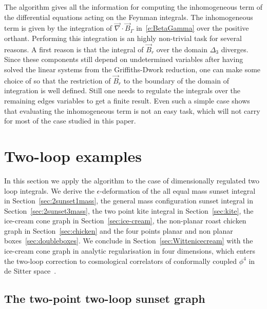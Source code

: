 \documentclass[a4paper,12pt]{article}
\numberwithin{equation}{section}
\numberwithin{figure}{section}
\begin{document}
The algorithm gives all the information for computing the
inhomogeneous term of the differential equations acting on the Feynman
integrals. The inhomogeneous term  is given by the  integration of
$\vec\nabla\cdot \vec B_\Gamma$ in~\eqref{e:BetaGamma}  over the
positive orthant. Performing this integration is an highly non-trivial
task for several reasons. A first reason is that the integral of $\vec B_r$
over the domain $\Delta_3$ diverges.
Since these components still
depend on undetermined variables  after having solved the linear systems from the
Griffiths-Dwork reduction, one can make some choice of so that the
restriction of $\vec B_r$ to the boundary of the domain of integration
is well defined. Still one needs to regulate the integrals over the
remaining edges variables  to get a finite
result.
Even such a simple case shows that evaluating the
inhomogeneous term is not an easy task, which will not carry for most
of the case studied in this paper. 


\section{Two-loop examples}\label{sec:twoloop}
%
In this section we apply the algorithm to  the case of dimensionally
 regulated two loop integrals. We derive the $\epsilon$-deformation of
the all equal mass sunset integral in Section~\ref{sec:2sunset1mass}, the general mass configuration
sunset integral in Section~\ref{sec:2sunset3mass}, the two point kite
integral in Section~\ref{sec:kite}, the ice-cream cone
graph in Section~\ref{sec:ice-cream}, the non-planar roast chicken
graph in Section~\ref{sec:chicken} and the four points planar
and non planar boxes~\ref{sec:doubleboxes}. We conclude in  Section~\ref{sec:Wittenicecream}
with the ice-cream cone graph in  analytic regularisation in four
dimensions, which enters the two-loop correction to cosmological
correlators of  conformally coupled $\phi^4$  in  de
 Sitter space~\cite{Chowdhury:2023arc}.
\subsection{The two-point  two-loop sunset graph}
\label{sec:two-loop-case}
\end{document}
